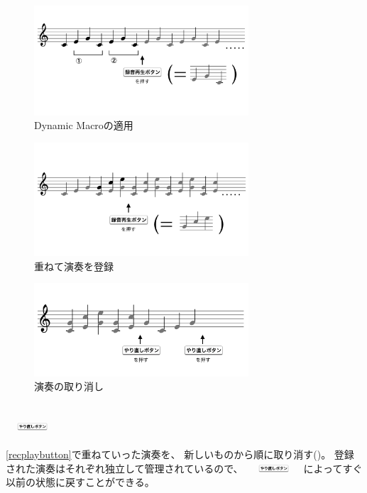 \begin{figure}[tb]
\includegraphics[width=8cm,bb=0 0 1038 532]{images/rp2.png}
\centering
\caption{Dynamic Macroの適用}
\label{recplay2}
\end{figure}

\begin{figure}[tb]
\includegraphics[width=8cm,bb=0 0 1026 544]{images/rp3.png}
\centering
\caption{重ねて演奏を登録}
\label{recplay3}
\end{figure}

\begin{figure}[tb]
\includegraphics[width=8cm,bb=0 0 1010 440]{images/rp4.png}
\centering
\caption{演奏の取り消し}
\label{recplay4}
\end{figure}

\subsection{\protect\includegraphics[height=3mm,width=20mm,bb=3 23 360 80]{images/undobutton.png}}

\ref{recplaybutton}で重ねていった演奏を、
新しいものから順に取り消す()。
登録された演奏はそれぞれ独立して管理されているので、
\includegraphics[height=3mm,width=20mm,bb=3 23 360 80]{images/undobutton.png}
によってすぐ以前の状態に戻すことができる。
